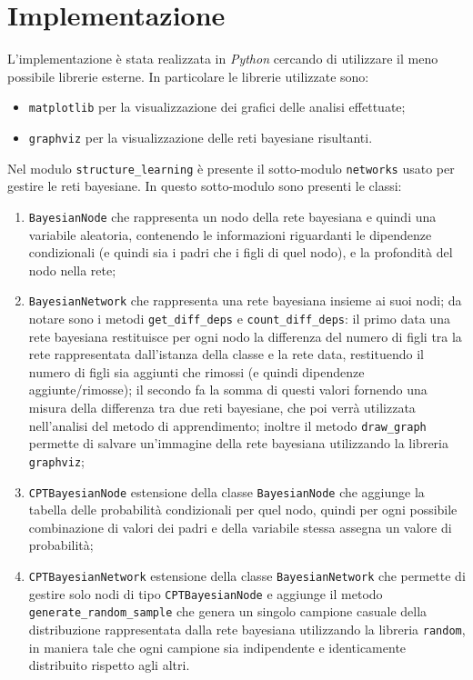 \section{Implementazione}

L'implementazione è stata realizzata in \textit{Python} cercando di utilizzare il meno possibile
librerie esterne. In particolare le librerie utilizzate sono:
\begin{itemize}
      \item \texttt{matplotlib} per la visualizzazione dei grafici delle analisi effettuate;
      \item \texttt{graphviz} per la visualizzazione delle reti bayesiane risultanti.
\end{itemize}

Nel modulo \texttt{structure\_learning} è presente il sotto-modulo \texttt{networks} usato per
gestire le reti bayesiane. In questo sotto-modulo sono presenti le classi:
\begin{enumerate}
      \item \texttt{BayesianNode} che rappresenta un nodo della rete bayesiana e quindi una variabile aleatoria,
            contenendo le informazioni riguardanti le dipendenze condizionali (e quindi sia i padri che i figli di quel nodo),
            e la profondità del nodo nella rete;
      \item \texttt{BayesianNetwork} che rappresenta una rete bayesiana insieme ai suoi nodi; da notare sono i metodi
            \texttt{get\_diff\_deps} e \texttt{count\_diff\_deps}: il primo data una rete bayesiana restituisce per ogni nodo
            la differenza del numero di figli tra la rete rappresentata dall'istanza della classe e la rete data, restituendo
            il numero di figli sia aggiunti che rimossi (e quindi dipendenze aggiunte/rimosse); il secondo fa la somma di questi
            valori fornendo una misura della differenza tra due reti bayesiane, che poi verrà utilizzata nell'analisi del metodo di apprendimento;
            inoltre il metodo \texttt{draw\_graph} permette di salvare un'immagine della rete bayesiana utilizzando la libreria
            \texttt{graphviz};
      \item \texttt{CPTBayesianNode} estensione della classe \texttt{BayesianNode} che aggiunge la tabella delle probabilità
            condizionali per quel nodo, quindi per ogni possibile combinazione di valori dei padri e della variabile stessa assegna un
            valore di probabilità;
      \item \texttt{CPTBayesianNetwork} estensione della classe \texttt{BayesianNetwork} che permette di gestire solo nodi di tipo
            \texttt{CPTBayesianNode} e aggiunge il metodo \texttt{generate\_random\_sample} che genera un singolo campione casuale
            della distribuzione rappresentata dalla rete bayesiana utilizzando la libreria \texttt{random}, in maniera tale che ogni
            campione sia indipendente e identicamente distribuito rispetto agli altri.
\end{enumerate}


